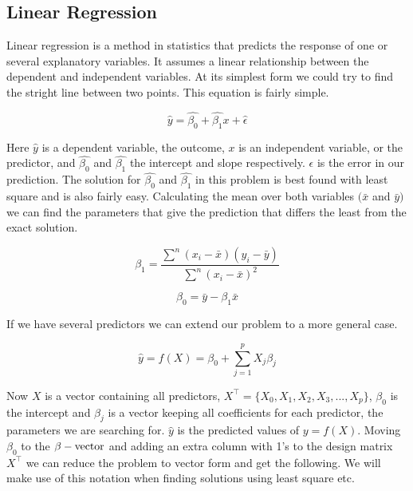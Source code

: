 \documentclass[a4paper,12pt, english]{article}
\begin{document}
\subsection{Linear Regression}

Linear regression is a method in statistics that predicts the response of one or several explanatory variables. It assumes a linear relationship between the dependent and independent variables. At its simplest form we could try to find the stright line between two points. This equation is fairly simple.

\begin{equation*}
\hat{y} = \hat{\beta_{0}} + \hat{\beta_{1}}x + \hat{\epsilon}
\end{equation*}

Here $\hat{y}$ is a dependent variable, the outcome, $x$ is an independent variable, or the predictor, and $\hat{\beta_{0}}$ and $\hat{\beta_{1}}$ the intercept and slope respectively. $\epsilon$ is the error in our prediction. The solution for $\hat{\beta_{0}}$ and $\hat{\beta_{1}}$ in this problem is best found with least square and is also fairly easy. Calculating the mean over both variables $(\bar{x}$ and $\bar{y})$ we can find the parameters that give the prediction that differs the least from the exact solution.

\begin{equation*}
\beta_1 = \frac{\sum^n (x_i - \bar{x})(y_i - \bar{y})}{\sum^n (x_i - \bar{x})^2}
\end{equation*}

\begin{equation*}
\beta_0 = \bar{y} - \beta_1 \bar{x}
\end{equation*}

If we have several predictors we can extend our problem to a more general case.

\begin{equation*}
\hat{y} = f(X) = \beta_{0} + \sum_{j=1}^{p} X_{j} \beta_{j}
\end{equation*}

Now $X$ is a vector containing all predictors, $X^{\top} = \{X_0, X_1, X_2, X_3,..., X_p\}$, $\beta_0$ is the intercept and $\beta_j$ is a vector keeping all coefficients for each predictor, the parameters we are searching for. $\hat{y}$ is the predicted values of $y = f(X)$. Moving $\beta_0$ to the $\beta-\textnormal{vector}$ and adding an extra column with 1's to the design matrix $X^{\top}$ we can reduce the problem to vector form and get the following. We will make use of this notation when finding solutions using least square etc. 
\end{document}
